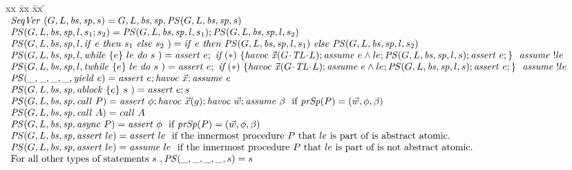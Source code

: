 \begin{figure*}
\begin{tabbing}
xx \= xx \= xx \= \kill
\noindent
$
\begin{array}{l}
\SeqVer(\varsG, \varsL, \bodies, \specs, s) = \varsG, \varsL, \bodies, \specs, \SeqProcStmt(\varsG, \varsL, \bodies, \specs,s)\\
\SeqProcStmt(\varsG, \varsL, \bodies, \specs, l, s_1; s_2) =  \SeqProcStmt(\varsG, \varsL, \bodies, \specs, l, s_1);   \SeqProcStmt(\varsG, \varsL, \bodies, \specs, l, s_2)\\
\SeqProcStmt(\varsG, \varsL, \bodies, \specs, l, \ite{e}{s_1}{ s_2}) =  \ite{e}{\SeqProcStmt(\varsG, \varsL, \bodies, \specs, l, s_1)}{\SeqProcStmt(\varsG, \varsL, \bodies, \specs, l, s_2)}\\
\SeqProcStmt(\varsG, \varsL, \bodies, \specs, l, \while{e}{le}{s}) =  \assert{e};\ \textit{if}\ {(*)}\ { \{ \havoc{\xs(\vars)}; \assume{e \wedge le}; \SeqProcStmt(\varsG, \varsL, \bodies, \specs, l, s); \assert{e};\}\ }\  \assume{!le}\\
\SeqProcStmt(\varsG, \varsL, \bodies, \specs, l, \termwhile{e}{le}{s}) =  \assert{e};\ \textit{if}\ {(*)}\ { \{ \havoc{\xs(\vars)}; \assume{e \wedge le}; \SeqProcStmt(\varsG, \varsL, \bodies, \specs, l, s); \assert{e};\}\ }\  \assume{!le}\\
\SeqProcStmt(\_, \_, \_, \_, \yield{e}) =  \assert{e}; \havoc{\vec{x}}; \assume{e}\\
\SeqProcStmt(\varsG, \varsL, \bodies, \specs, \ablock{e}{s}) =  \assert{e}; s\\
\SeqProcStmt(\varsG, \varsL, \bodies, \specs, \call{P}) =  \assert{\phi}; \havoc{\vec{x}(g)}; \havoc{\vec{w}}; \assume{\beta}\ \mbox{ if}\ \procSpecs(P) = (\vec{w}, \phi, \beta)\\
\SeqProcStmt(\varsG, \varsL, \bodies, \specs, \call{A}) =  \call{A}\\
\SeqProcStmt(\varsG, \varsL, \bodies, \specs, \async{P}) =  \assert{\phi}\ \mbox{ if}\ \procSpecs(P) = (\vec{w}, \phi, \beta)\\
\SeqProcStmt(\varsG, \varsL, \bodies, \specs, \assert{le}) =  \assert{le}\ \mbox{ if the innermost procedure $P$ that $le$ is part of is abstract atomic.}\ \\
\SeqProcStmt(\varsG, \varsL, \bodies, \specs, \assert{le}) =  \assume{le}\ \mbox{ if the innermost procedure $P$ that $le$ is part of is not abstract atomic.}\ \\
\mbox{For all other types of statements $s$}\ , \SeqProcStmt(\_, \_, \_, \_,s) =  s\\
\end{array}
$
\end{tabbing}
\end{figure*}

